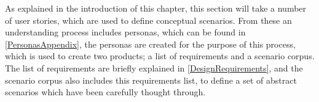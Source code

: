 As explained in the introduction of this chapter, this section will take a number of user stories, which are used to define conceptual scenarios. From these an understanding process includes personas, which can be found in \cref{PersonasAppendix}, the personas are created for the purpose of this process, which is used to create two products; a list of requirements and a scenario corpus. The list of requirements are briefly explained in \cref{DesignRequirements}, and the scenario corpus also includes this requirements list, to define a set of abstract scenarios which have been carefully thought through.